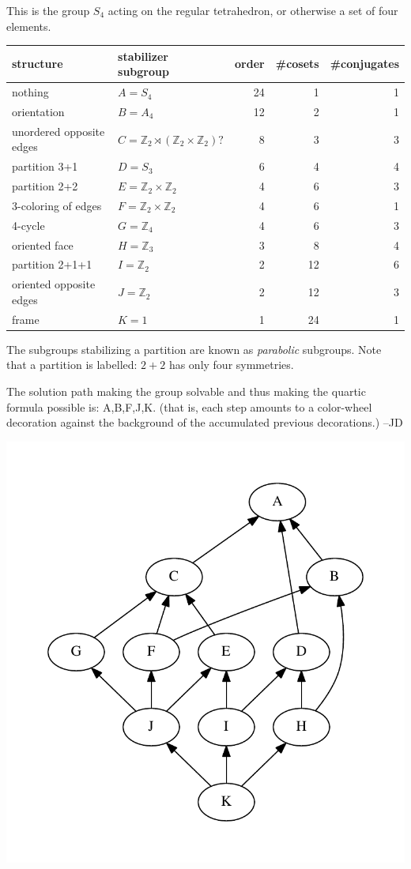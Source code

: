 \documentclass[11pt,oneside]{article}
\newcommand{\Integer}{\mathbb{Z}}
\begin{document}
This is the group $S_4$ acting on the regular tetrahedron,
or otherwise a set of four elements.

\begin{samepage}
\begin{center}
\begin{tabular}{ |l|l|r|r|r| }
\hline
structure & stabilizer subgroup & order & \#cosets & \#conjugates \\
\hline
\hline
nothing & $A=S_4$ &       24        &  1      &   1         \\
\hline
orientation & $B=A_4$ &       12        &  2      &   1         \\
\hline
unordered opposite edges & $C=\Integer_2\rtimes(\Integer_2\times\Integer_2) ?$ 
    &       8        &  3      &   3         \\
\hline
partition 3+1 & $D=S_3$ &       6        &  4      &   4         \\
\hline
partition 2+2 & $E=\Integer_2\times\Integer_2$ 
    &       4        &  6      &   3      \\
\hline
3-coloring of edges & $F=\Integer_2\times\Integer_2$ 
     &       4        &  6      &   1     \\
\hline
4-cycle & $G=\Integer_4$ &       4        &  6      &   3    \\
\hline
oriented face & $H=\Integer_3$ &       3        &  8      &   4         \\
\hline
partition 2+1+1 & $I=\Integer_2$ &       2        &  12      &   6       \\
\hline
oriented opposite edges & $J=\Integer_2$ &       2        &  12      &    3       \\
\hline
frame & $K=1 $ &       1        &  24      &   1         \\
\hline
\end{tabular}
\end{center}
\end{samepage}

The subgroups stabilizing a partition are known as {\it parabolic}
subgroups. Note that a partition is labelled: $2+2$ has only four symmetries.

The solution path making the group solvable and thus making the
quartic formula possible is: A,B,F,J,K. (that is, each step amounts
to a color-wheel decoration against the background of the accumulated
previous decorations.) --JD

\begin{center}
\includegraphics[width=0.5\columnwidth]{subgroups_s4.pdf} 
\end{center}
\end{document}
